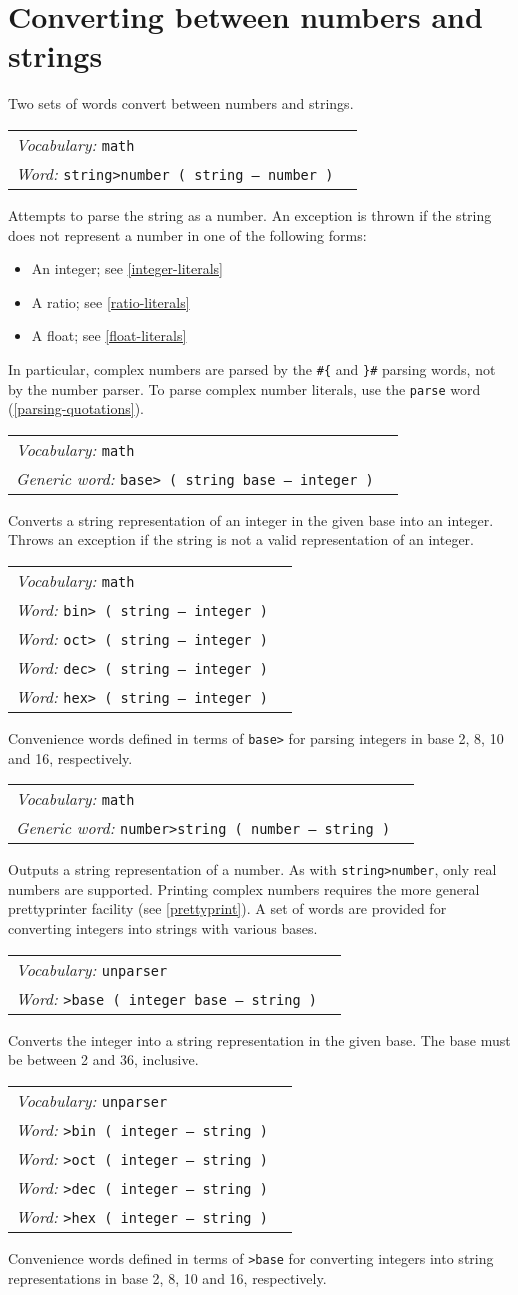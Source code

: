 \documentclass{book}
\newcommand{\vocabulary}[1]{\emph{Vocabulary:} \texttt{#1}&\\}
\newcommand{\ordinaryword}[2]{\index{\texttt{#1}}\emph{Word:} \texttt{#2}&\\}
\newcommand{\genericword}[2]{\index{\texttt{#1}}\emph{Generic word:} \texttt{#2}&\\}
\newcommand{\wordtable}[1]{


\begin{tabularx}{12cm}{lX}
\hline
#1
\hline
\end{tabularx}

}
\begin{document}
\section{Converting between numbers and strings}\label{parsing-numbers}

Two sets of words convert between numbers and strings.

\wordtable{
\vocabulary{math}
\ordinaryword{string>number}{string>number~( string -- number )}
}
Attempts to parse the string as a number. An exception is thrown if the string does not represent a number in one of the following forms:
\begin{itemize}
\item An integer; see \ref{integer-literals}
\item A ratio; see \ref{ratio-literals}
\item A float; see \ref{float-literals}
\end{itemize}
In particular, complex numbers are parsed by the \verb|#{| and \verb|}#| parsing words, not by the number parser. To parse complex number literals, use the \texttt{parse} word (\ref{parsing-quotations}).
\wordtable{
\vocabulary{math}
\genericword{base>}{base>~( string base -- integer )}
}
Converts a string representation of an integer in the given base into an integer. Throws an exception if the string is not a valid representation of an integer.
\wordtable{
\vocabulary{math}
\ordinaryword{bin>}{bin>~( string -- integer )}
\ordinaryword{oct>}{oct>~( string -- integer )}
\ordinaryword{dec>}{dec>~( string -- integer )}
\ordinaryword{hex>}{hex>~( string -- integer )}
}
Convenience words defined in terms of \texttt{base>} for parsing integers in base 2, 8, 10 and 16, respectively.

\wordtable{
\vocabulary{math}
\genericword{number>string}{number>string~( number -- string~)}
}
Outputs a string representation of a number. As with \verb|string>number|, only real numbers are supported. Printing complex numbers requires the more general prettyprinter facility (see \ref{prettyprint}).
A set of words are provided for converting integers into strings with various bases.
\wordtable{
\vocabulary{unparser}
\ordinaryword{>base}{>base~( integer base -- string~)}
}
Converts the integer into a string representation in the given base. The base must be between 2 and 36, inclusive.
\wordtable{
\vocabulary{unparser}
\ordinaryword{>bin}{>bin~( integer -- string~)}
\ordinaryword{>oct}{>oct~( integer -- string~)}
\ordinaryword{>dec}{>dec~( integer -- string~)}
\ordinaryword{>hex}{>hex~( integer -- string~)}
}
Convenience words defined in terms of \texttt{>base} for converting integers into string representations in base 2, 8, 10 and 16, respectively.
\end{document}
